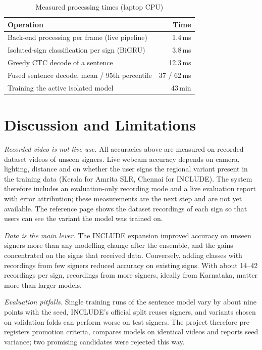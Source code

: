 \documentclass[conference]{IEEEtran}
\begin{document}
\begin{table}[t]
\caption{Measured processing times (laptop CPU)}
\label{tab:latency}
\centering
\begin{tabular}{@{}lr@{}}
\toprule
Operation & Time \\
\midrule
Back-end processing per frame (live pipeline) & 1.4\,ms \\
Isolated-sign classification per sign (BiGRU) & 3.8\,ms \\
Greedy CTC decode of a sentence & 12.3\,ms \\
Fused sentence decode, mean / 95th percentile & 37 / 62\,ms \\
Training the active isolated model & 43\,min \\
\bottomrule
\end{tabular}
\end{table}

\section{Discussion and Limitations}
\textit{Recorded video is not live use.} All accuracies above are measured on recorded dataset videos of unseen signers. Live webcam accuracy depends on camera, lighting, distance and on whether the user signs the regional variant present in the training data (Kerala for Amrita SLR, Chennai for INCLUDE). The system therefore includes an evaluation-only recording mode and a live evaluation report with error attribution; these measurements are the next step and are not yet available. The reference page shows the dataset recordings of each sign so that users can see the variant the model was trained on.

\textit{Data is the main lever.} The INCLUDE expansion improved accuracy on unseen signers more than any modelling change after the ensemble, and the gains concentrated on the signs that received data. Conversely, adding classes with recordings from few signers reduced accuracy on existing signs. With about 14--42 recordings per sign, recordings from more signers, ideally from Karnataka, matter more than larger models.

\textit{Evaluation pitfalls.} Single training runs of the sentence model vary by about nine points with the seed, INCLUDE's official split reuses signers, and variants chosen on validation folds can perform worse on test signers. The project therefore pre-registers promotion criteria, compares models on identical videos and reports seed variance; two promising candidates were rejected this way.
\end{document}
